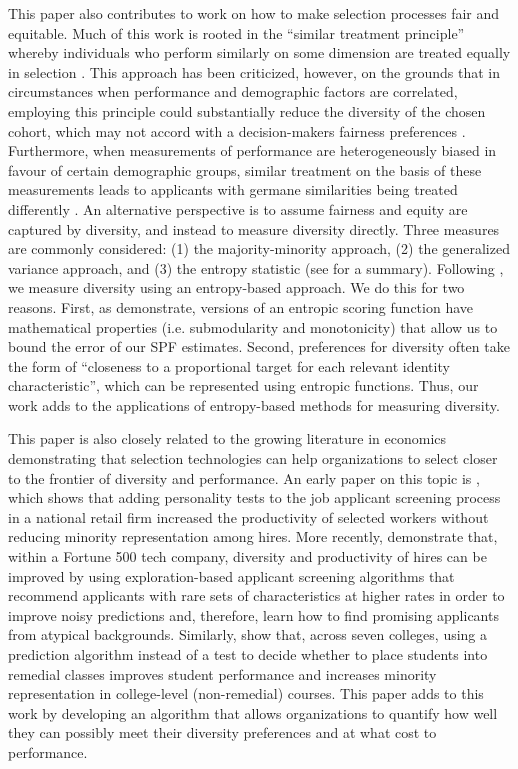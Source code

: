 This paper also contributes to work on how to make selection processes fair and equitable. Much of this work is rooted in the ``similar treatment principle'' whereby individuals who perform similarly on some dimension are treated equally in selection \cite{dwork2012fairness}. This approach has been criticized, however, on the grounds that in circumstances when performance and demographic factors are correlated, employing this principle could substantially reduce the diversity of the chosen cohort, which may not accord with a decision-makers fairness preferences \cite{fleisher2021s}. Furthermore, when measurements of performance are heterogeneously biased in favour of certain demographic groups, similar treatment on the basis of these measurements leads to applicants with germane similarities being treated differently \cite{fleisher2021s}. An alternative perspective is to assume fairness and equity are captured by diversity, and instead to measure diversity directly. Three measures are commonly considered: (1) the majority-minority approach, (2) the generalized variance approach, and (3) the entropy statistic (see \textcite{budescu2012measure} for a summary). Following \textcite{huppenkothen2020entrofy}, we measure diversity using an entropy-based approach. We do this for two reasons. First, as \textcite{huppenkothen2020entrofy} demonstrate, versions of an entropic scoring function have mathematical properties (i.e. submodularity and monotonicity) that allow us to bound the error of our SPF estimates. Second, preferences for diversity often take the form of ``closeness to a proportional target for each relevant identity characteristic'', which can be represented using entropic functions. Thus, our work adds to the applications of entropy-based methods for measuring diversity.

This paper is also closely related to the growing literature in economics demonstrating that selection technologies can help organizations to select closer to the frontier of diversity and performance. An early paper on this topic is \textcite{autor2008does}, which shows that adding personality tests to the job applicant screening process in a national retail firm increased the productivity of selected workers without reducing minority representation among hires. More recently, \textcite{li2020hiring} demonstrate that,  within a Fortune 500 tech company, diversity and productivity of hires can be improved by using exploration-based applicant screening algorithms that recommend applicants with rare sets of characteristics at higher rates in order to improve noisy predictions and, therefore, learn how to find promising applicants from atypical backgrounds. Similarly, \textcite{bergman2021seven} show that, across seven colleges, using a prediction algorithm instead of a test to decide whether to place students into remedial classes improves student performance and increases minority representation in college-level (non-remedial) courses. This paper adds to this work by developing an algorithm that allows organizations to quantify how well they can possibly meet their diversity preferences and at what cost to performance. 

